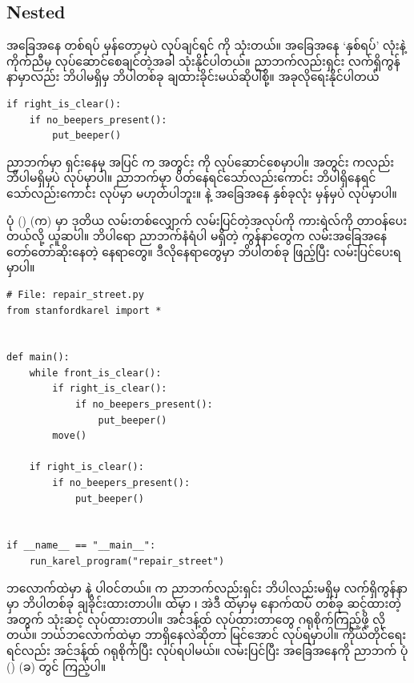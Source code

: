 \subsection*{Nested }
အခြေအနေ တစ်ရပ် မှန်တော့မှပဲ လုပ်ချင်ရင်  ကို သုံးတယ်။  
အခြေအနေ ‘နှစ်ရပ်’ လုံးနဲ့ ကိုက်ညီမှ လုပ်ဆောင်စေချင်တဲ့အခါ   သုံးနိုင်ပါတယ်။ ညာဘက်လည်းရှင်း လက်ရှိကွန်နာမှာလည်း ဘိပါမရှိမှ ဘိပါတစ်ခု ချထားခိုင်းမယ်ဆိုပါစို့။ အခုလိုရေးနိုင်ပါတယ်
%
\setlength{\fboxsep}{0pt}
\begin{verbatim}
if right_is_clear():
    if no_beepers_present():
        put_beeper()
\end{verbatim}
%
ညာဘက်မှာ ရှင်းနေမှ အပြင်  က အတွင်း  ကို လုပ်ဆောင်စေမှာပါ။ အတွင်း  ကလည်း ဘိပါမရှိမှပဲ  လုပ်မှာပါ။ ညာဘက်မှာ ပိတ်နေရင်သော်လည်းကောင်း ဘိပါရှိနေရင်သော်လည်းကောင်း  လုပ်မှာ မဟုတ်ပါဘူး။  နဲ့  အခြေအနေ နှစ်ခုလုံး မှန်မှပဲ လုပ်မှာပါ။

ပုံ (\fRefNo{\ref{fig:st_repair}}) (က) မှာ ဒုတိယ လမ်းတစ်လျှောက် လမ်းပြင်တဲ့အလုပ်ကို ကားရဲလ်ကို တာဝန်ပေးတယ်လို့ ယူဆပါ။ ဘိပါရော ညာဘက်နံရံပါ မရှိတဲ့ ကွန်နာတွေက  လမ်းအခြေအနေ တော်တော်ဆိုးနေတဲ့ နေရာတွေ။ ဒီလိုနေရာတွေမှာ ဘိပါတစ်ခု ဖြည့်ပြီး လမ်းပြင်ပေးရမှာပါ။ 
%
\setlength{\fboxsep}{0pt}
\begin{verbatim}
# File: repair_street.py
from stanfordkarel import *


def main():
    while front_is_clear():
        if right_is_clear():
            if no_beepers_present():
                put_beeper()
        move()

    if right_is_clear():
        if no_beepers_present():
            put_beeper()


if __name__ == "__main__":
    run_karel_program("repair_street")
\end{verbatim}
%
 ဘလောက်ထဲမှာ   နဲ့  ပါဝင်တယ်။   က ညာဘက်လည်းရှင်း ဘိပါလည်းမရှိမှ လက်ရှိကွန်နာမှာ ဘိပါတစ်ခု ချခိုင်းထားတာပါ။   ထဲမှာ ၊ အဲဒီ  ထဲမှာမှ နောက်ထပ်  တစ်ခု ဆင့်ထားတဲ့အတွက် သုံးဆင့်  လုပ်ထားတာပါ။ အင်ဒန့်ထ် လုပ်ထားတာတွေ ဂရုစိုက်ကြည့်ဖို့ လိုတယ်။ ဘယ်ဘလောက်ထဲမှာ ဘာရှိနေလဲဆိုတာ မြင်အောင် လုပ်ရမှာပါ။ ကိုယ်တိုင်ရေးရင်လည်း အင်ဒန့်ထ် ဂရုစိုက်ပြီး လုပ်ရပါမယ်။ လမ်းပြင်ပြီး အခြေအနေကို ညာဘက် ပုံ (\fRefNo{\ref{fig:st_repair}}) (ခ) တွင် ကြည့်ပါ။

